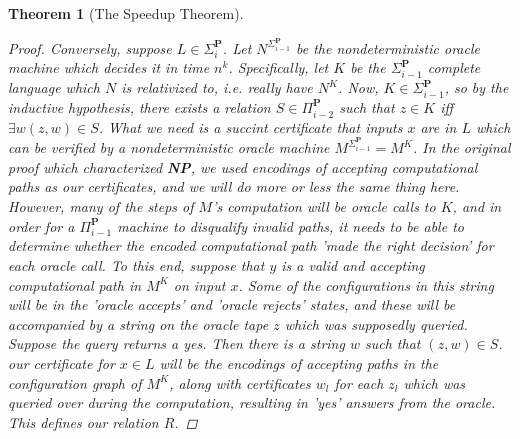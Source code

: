 \documentclass{article}
\theoremstyle{definition}
\theoremstyle{plain}
\theoremstyle{theorem}
\newtheorem{theorem}{Theorem}[section]
\begin{document}
\begin{theorem}[The Speedup Theorem]
\begin{proof}
    \par Conversely, suppose $L \in \Sigma_i^{\textbf{P}}$. Let $N^{\Sigma_{i-1}^{\textbf{P}}}$ be the nondeterministic oracle machine which decides it in time $n^k$. Specifically, let $K$ be the $\Sigma_{i-1}^{\textbf{P}}$ complete language which $N$ is relativized to, i.e. really have $N^K$. Now, $K \in \Sigma_{i-1}^{\textbf{P}}$, so by the inductive hypothesis, there exists a relation $S \in \Pi_{i-2}^{\textbf{P}}$ such that $z \in K$ iff $\exists w (z,w) \in S$. What we need is a succint certificate that inputs $x$ are in $L$ which can be verified by a nondeterministic oracle machine $M^{\Sigma_{i-1}^{\textbf{P}}} = M^K$. In the original proof which characterized \textbf{NP}, we used encodings of accepting computational paths as our certificates, and we will do more or less the same thing here. However, many of the steps of $M$'s computation will be oracle calls to $K$, and in order for a $\Pi_{i-1}^{\textbf{P}}$ machine to disqualify invalid paths, it needs to be able to determine whether the encoded computational path 'made the right decision' for each oracle call. To this end, suppose that $y$ is a valid and accepting computational path in $M^K$ on input $x$. Some of the configurations in this string will be in the 'oracle accepts' and 'oracle rejects' states, and these will be accompanied by a string on the oracle tape $z$ which was supposedly queried. Suppose the query returns a yes. Then there is a string $w$ such that $(z,w) \in S$. \textit{our certificate for $x \in L$ will be the encodings of accepting paths in the configuration graph of $M^K$, along with certificates $w_l$ for each $z_l$ which was queried over during the computation, resulting in 'yes' answers from the oracle.} This defines our relation $R$.

\end{proof}
\end{theorem}
\end{document}
